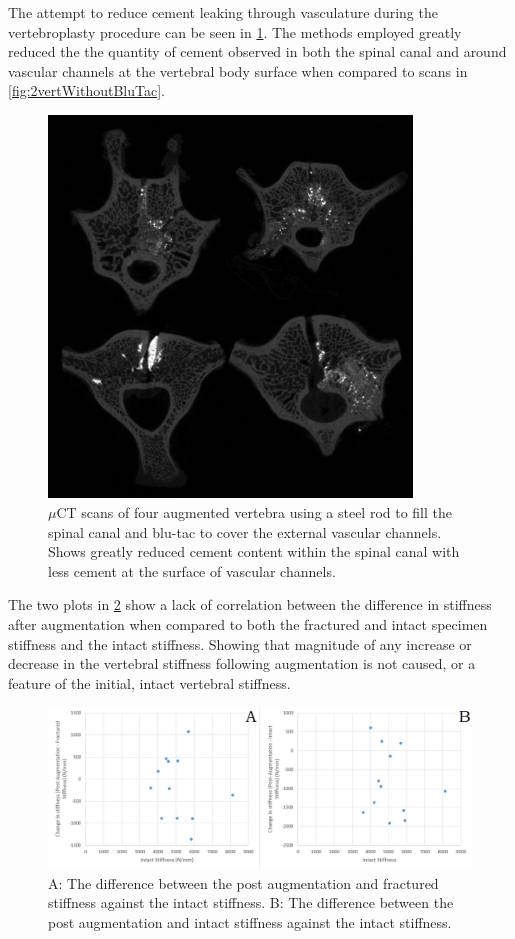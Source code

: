 The attempt to reduce cement leaking through vasculature during the
vertebroplasty procedure can be seen in \cref{fig:4vert_withBlutac}. The
methods employed greatly reduced the the quantity of cement observed in both
the spinal canal and around vascular channels at the vertebral body surface
when compared to scans in \cref{fig:2vertWithoutBluTac}.

\begin{figure}[ht!]
\centering
\includegraphics[width=3.8in]{images/4vertPostBluTac.png}
\caption{$\mu$CT scans of four augmented vertebra using a steel rod to fill the spinal canal and blu-tac to cover the external vascular channels. Shows greatly reduced cement content within the spinal canal with less cement at the surface of vascular channels.}
\label{fig:4vert_withBlutac}
\end{figure}


The two plots in \cref{fig:deltaStiffness_Vs_intact} show a lack of correlation
between the difference in stiffness after augmentation when compared to both
the fractured and intact specimen stiffness and the intact stiffness. Showing
that magnitude of any increase or decrease in the vertebral stiffness following
augmentation is not caused, or a feature of the initial, intact vertebral
stiffness.

\begin{figure}[ht!]
\centering
\includegraphics[width=\textwidth]{images/deltaStiffnessVsIntact.png}
\caption{A: The difference between the post augmentation and fractured stiffness against the intact stiffness. B: The difference between the post augmentation and intact stiffness against the intact stiffness.}
\label{fig:deltaStiffness_Vs_intact}
\end{figure}



